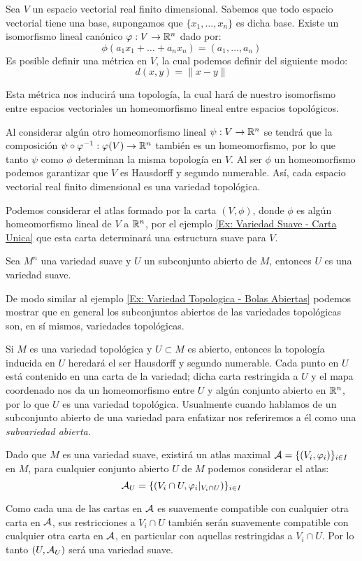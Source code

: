 \begin{example}\label{Ex: Variedad Sauve - Espacios Vectoriales}
	Sea $V$ un espacio vectorial real finito dimensional. Sabemos que todo espacio vectorial tiene una base, supongamos que $\{x_1,\dots,x_n\}$ es dicha base. Existe un isomorfismo lineal canónico $\varphi: V \to \mathbb{R}^n$ dado por:
	\[ \phi(a_1 x_1 + \dots + a_n x_n) = (a_1, \dots, a_n) \]
	Es posible definir una métrica en $V$, la cual podemos definir del siguiente modo:
	\[d(x,y) = \|x - y\|\]

    Esta métrica nos inducirá una topología, la cual hará de nuestro isomorfismo entre espacios vectoriales un homeomorfismo lineal entre espacios topológicos.

	Al considerar algún otro homeomorfismo lineal $\psi: V \to \mathbb{R}^n$ se tendrá que la composición $\psi \circ \varphi^{-1}: \varphi(V) \to \mathbb{R}^n$ también es un homeomorfismo, por lo que tanto $\psi$ como $\phi$ determinan la misma topología en $V$. Al ser $\phi$ un homeomorfismo podemos garantizar que $V$ es Hausdorff y segundo numerable. Así, cada espacio vectorial real finito dimensional es una variedad topológica.

	Podemos considerar el atlas formado por la carta $(V,\phi)$, donde $\phi$ es algún homeomorfismo lineal de $V$ a $\mathbb{R}^n$, por el ejemplo \ref{Ex: Variedad Suave - Carta Unica} que esta carta determinará una estructura suave para $V$.
\end{example}

\begin{example}\label{Ex: Variedad Suave - Subvariedades Suaves}
	Sea $M^n$ una variedad suave y $U$ un subconjunto abierto de $M$, entonces $U$ es una variedad suave.

	De modo similar al ejemplo \ref{Ex: Variedad Topologica - Bolas Abiertas} podemos mostrar que en general los subconjuntos abiertos de las variedades topológicas son, en sí mismos, variedades topológicas.

	Si $M$ es una variedad topológica y $U \subset M$ es abierto, entonces la topología inducida en $U$ heredará el ser Hausdorff y segundo numerable. Cada punto en $U$ está contenido en una carta de la variedad; dicha carta restringida a $U$ y el mapa coordenado nos da un homeomorfismo entre $U$ y algún conjunto abierto en $\mathbb{R}^n$, por lo que $U$ es una variedad topológica. Usualmente cuando hablamos de un subconjunto abierto de una variedad para enfatizar nos referiremos a él como una \it{subvariedad abierta}.

	Dado que $M$ es una variedad suave, existirá un atlas maximal $\mathcal{A} = \{(V_i,\varphi_i) \}_{i \in I}$ en $M$, para cualquier conjunto abierto $U$ de $M$ podemos considerar el atlas:
	\[ \mathcal{A}_U = \{(V_i \cap U, \varphi_i |_{V_i \cap U})\}_{i \in I} \]

	Como cada una de las cartas en $\mathcal{A}$ es suavemente compatible con cualquier otra carta en $\mathcal{A}$, sus restricciones a $V_i \cap U$ también serán suavemente compatible con cualquier otra carta en $\mathcal{A}$, en particular con aquellas restringidas a $V_i \cap U$. Por lo tanto $(U, \mathcal{A}_U)$ será una variedad suave.
\end{example}

